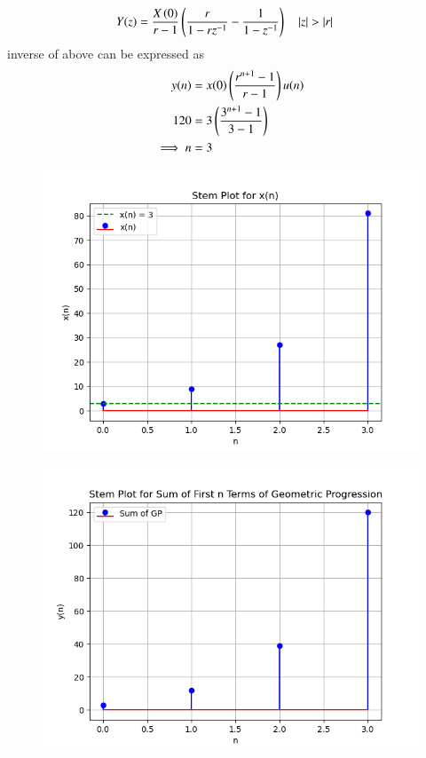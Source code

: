 \documentclass[journal,12pt,twocolumn]{IEEEtran}
\theoremstyle{remark}
\begin{document}
\begin{align}
Y(z)&=\frac{X\left(0\right)}{r-1}\left(\frac{r}{1-r z^{-1}}-\frac{1}{1- z^{-1}}\right)  \quad \left\vert z\right\vert > \left\vert r\right\vert
\end{align}
inverse of above can be expressed as 
\begin{align}
y(n) &= x(0)\left(\frac{r^{n+1}-1}{r-1}\right)u(n)\\
120 &= 3\left( \frac{3^{n+1}- 1}{3-1}\right)  \\
\implies n &= 3
\end{align}
\begin{figure}
   \includegraphics[width=1\linewidth]{figs/i1.png}
\end{figure}
\begin{figure}
   \includegraphics[width=1\linewidth]{figs/i2.png}
\end{figure}
\end{document}
